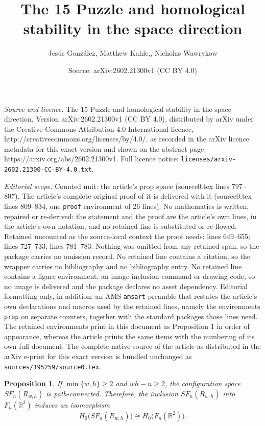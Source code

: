 \documentclass[10pt,a4paper]{amsart}
\title{The 15 Puzzle and homological stability in the space direction}
\author{Jes\'us Gonz\'alez, Matthew Kahle,, Nicholas Wawrykow}
\date{Source: arXiv:2602.21300v1 (CC BY 4.0)}
\newtheorem{prop}{Proposition}
\newcommand{\R}{\ensuremath{\mathbb{R}}}
\begin{document}
\maketitle

\noindent\emph{Source and licence.} The 15 Puzzle and homological stability in the space direction. Version arXiv:2602.21300v1 (CC BY 4.0), distributed by arXiv under the Creative Commons Attribution 4.0 International licence, http://creativecommons.org/licenses/by/4.0/, as recorded in the arXiv licence metadata for this exact version and shown on the abstract page https://arxiv.org/abs/2602.21300v1. Full licence notice: \texttt{licenses/arxiv-2602.21300-CC-BY-4.0.txt}.\par\smallskip

\noindent\textit{Editorial scope.} Counted unit: the article's prop space (source0.tex lines 797--807). The article's complete original proof of it is delivered with it (source0.tex lines 809--834, one \texttt{proof} environment of 26 lines). No mathematics is written, repaired or re-derived: the statement and the proof are the article's own lines, in the article's own notation, and no retained line is substituted or re-flowed.  Retained uncounted as the source-local context the proof needs: lines 649--655; lines 727--733; lines 781--783.  Nothing was omitted from any retained span, so the package carries no omission record.  No retained line contains a citation, so the wrapper carries no bibliography and no bibliography entry.  No retained line contains a figure environment, an image-inclusion command or drawing code, so no image is delivered and the package declares no asset dependency.  Editorial formatting only, in addition: an AMS \texttt{amsart} preamble that restates the article's own declarations and macros used by the retained lines, namely the environments \texttt{prop} on separate counters, together with the standard packages those lines need.  The retained environments print in this document as Proposition 1 in order of appearance, whereas the article prints the same items with the numbering of its own full document.  The complete native source of the article as distributed in the arXiv e-print for this exact version is bundled unchanged as \texttt{sources/195259/source0.tex}.
\begin{prop}\label{n le wh-2 is connected}
If $\min\{w, h\}\ge 2$ and $wh-n\ge 2$, the configuration space $SF_{n}(R_{w,h})$ is path-connected.
Therefore, the inclusion $SF_{n}(R_{w,h})$ into $F_{n}(\R^{2})$ induces an isomorphism
\[
H_{0}\big(SF_{n}(R_{w,h})\big)\cong H_{0}\big( F_{n}(\R^{2})\big).
\]
\end{prop}
\end{document}
